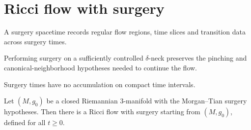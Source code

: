 \chapter{Ricci flow with surgery}

\begin{definition}
  \label{def:surgery-spacetime}
  A surgery spacetime records regular flow regions, time slices and transition
  data across surgery times.
\end{definition}

\begin{theorem}
  \label{thm:surgery-preserves-pinching}
  \notready
  Performing surgery on a sufficiently controlled $\delta$-neck preserves the
  pinching and canonical-neighborhood hypotheses needed to continue the flow.
\end{theorem}

\begin{theorem}
  \label{thm:surgery-times-locally-finite}
  \notready
  Surgery times have no accumulation on compact time intervals.
\end{theorem}

\begin{theorem}
  \label{thm:long-time-surgery-flow}
  \notready
  Let $(M,g_0)$ be a closed Riemannian 3-manifold with the Morgan--Tian surgery
  hypotheses. Then there is a Ricci flow with surgery starting from $(M,g_0)$,
  defined for all $t \ge 0$.
\end{theorem}
